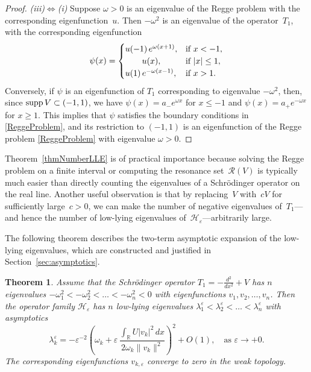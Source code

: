 \documentclass[reqno]{amsart}
\newtheorem{thm}{Theorem}
\theoremstyle{definition}
\theoremstyle{remark}
\numberwithin{equation}{section}
\newcommand{\supp}{\mathop{\rm supp}}
\newcommand{\Real}{\mathbb R}
\newcommand{\eps}{\varepsilon}
\newcommand{\cH}{\mathcal{H}}
\newcommand{\cR}{\mathcal{R}}
\begin{document}
\begin{proof}
\textit{(iii)$\Leftrightarrow$(i)}
 Suppose $\omega>0$ is an eigenvalue of the Regge problem with the corresponding eigenfunction~$u$. Then $-\omega^2$ is an eigenvalue of the operator~$T_1$, with the corresponding eigenfunction
\begin{equation}\label{ReggeEigenState}
	\psi(x) = \begin{cases}
		u(-1)\,e^{\omega (x+1)}, &\text{if } x < -1, \\
		\hfil u(x),   &\text{if } |x| \le 1, \\
		u(1)\,e^{-\omega (x-1)}, &\text{if } x > 1.
	\end{cases}
\end{equation}
Conversely, if $\psi$ is an eigenfunction of $T_1$ corresponding to eigenvalue $-\omega^2$, then, since $\supp V\subset (-1,1)$, we have $\psi(x)=a_- e^{\omega x}$ for $x\le-1$ and $\psi(x)=a_+ e^{-\omega x}$ for $x\ge1$. This implies that $\psi$ satisfies the boundary conditions in \eqref{ReggeProblem}, and its restriction to $(-1,1)$ is an eigenfunction of the Regge problem \eqref{ReggeProblem} with eigenvalue $\omega>0$.
\end{proof}


Theorem~\ref{thmNumberLLE} is of practical importance because solving the Regge problem on a finite interval or computing the resonance set~$\cR(V)$ is typically much easier than directly counting the eigenvalues of a Schrödinger operator on the real line. Another useful observation is that by replacing~$V$ with~$cV$ for sufficiently large~$c > 0$, we can make the number of negative eigenvalues of~$T_1$---and hence the number of low-lying eigenvalues of~$\cH_\eps$---arbitrarily large.

The following theorem describes the two-term asymptotic expansion of the low-lying eigenvalues, which are constructed and justified in Section~\ref{sec:asymptotics}.

%
\begin{thm}\label{TheoremDeltaPrime}
	Assume  that the Schr\"odinger operator $T_1=-\frac{d^2}{dx^2}+V$ has $n$  eigenvalues $-\omega_1^2 <-\omega_2^2<\dots<-\omega_n^2<0$ with  eigenfunctions $v_1, v_2, \dots, v_n$. Then the operator family $\cH_\eps$  has $n$ low-lying eigenvalues $\lambda^\eps_1<\lambda^\eps_2< \dots < \lambda^\eps_n$  with asymptotics
	\begin{equation}\label{LowLyingAsymptotics}
		\lambda^\eps_k=-\eps^{-2}\left(\omega_k+\eps\,\dfrac{\int_\Real U|v_k|^2\,dx}{2\omega_k \|v_k\|^2}\right)^2+O(1),\quad \text{as } \eps\to +0.
	\end{equation}
	The corresponding eigenfunctions $v_{k,\eps}$ converge to zero in the weak topology.
\end{thm}
%
\end{document}
